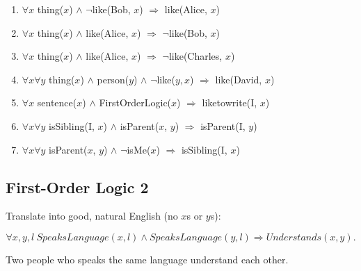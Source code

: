 \documentclass[11pt, answers]{exam}
\begin{document}
\begin{solution}
\begin{enumerate}[a]
\item
$\forall x$ thing($x$) $\wedge$ $\neg$like(Bob, $x$) $\Rightarrow$ like(Alice, $x$)
\item
$\forall x$ thing($x$) $\wedge$ like(Alice, $x$) $\Rightarrow$ $\neg$like(Bob, $x$)
\item
$\forall x$ thing($x$) $\wedge$ like(Alice, $x$) $\Rightarrow$ $\neg$like(Charles, $x$)
\item
$\forall x \forall y$ thing($x$) $\wedge$ person($y$) $\wedge$ $\neg$like($y,x$) $\Rightarrow$ like(David, $x$)
\item
$\forall x$ sentence($x$) $\wedge$ FirstOrderLogic($x$) $\Rightarrow$ liketowrite(I, $x$)
\item
$\forall x\forall y$ isSibling(I, $x$) $\wedge$ isParent($x$, $y$) $\Rightarrow$ isParent(I, $y$)
\item
$\forall x\forall y$ isParent($x$, $y$) $\wedge$ $\neg$isMe($x$) $\Rightarrow$ isSibling(I, $x$)
\end{enumerate}

\end{solution}

%
%
\begin{questions}
\section{First-Order Logic 2}
\question

Translate into good, natural English (no $x$s or $y$s):

$$\forall x,y,l\ SpeaksLanguage(x,l)\wedge SpeaksLanguage(y,l)\Rightarrow Understands(x,y).$$

\end{questions}

\begin{solution}
Two people who speaks the same language understand each other.
\end{solution}
\end{document}
